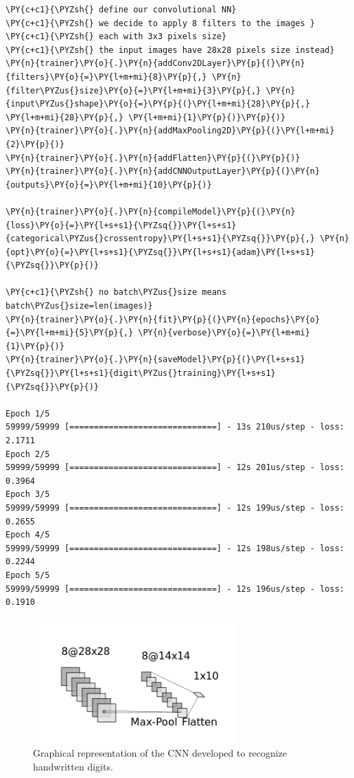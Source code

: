 \begin{tcolorbox}[breakable, size=fbox, boxrule=1pt, pad at break*=1mm,colback=cellbackground, colframe=cellborder]
\begin{Verbatim}[commandchars=\\\{\}]
\PY{c+c1}{\PYZsh{} define our convolutional NN}
\PY{c+c1}{\PYZsh{} we decide to apply 8 filters to the images }
\PY{c+c1}{\PYZsh{} each with 3x3 pixels size}
\PY{c+c1}{\PYZsh{} the input images have 28x28 pixels size instead}
\PY{n}{trainer}\PY{o}{.}\PY{n}{addConv2DLayer}\PY{p}{(}\PY{n}{filters}\PY{o}{=}\PY{l+m+mi}{8}\PY{p}{,} \PY{n}{filter\PYZus{}size}\PY{o}{=}\PY{l+m+mi}{3}\PY{p}{,} \PY{n}{input\PYZus{}shape}\PY{o}{=}\PY{p}{(}\PY{l+m+mi}{28}\PY{p}{,} \PY{l+m+mi}{28}\PY{p}{,} \PY{l+m+mi}{1}\PY{p}{)}\PY{p}{)}
\PY{n}{trainer}\PY{o}{.}\PY{n}{addMaxPooling2D}\PY{p}{(}\PY{l+m+mi}{2}\PY{p}{)}
\PY{n}{trainer}\PY{o}{.}\PY{n}{addFlatten}\PY{p}{(}\PY{p}{)}
\PY{n}{trainer}\PY{o}{.}\PY{n}{addCNNOutputLayer}\PY{p}{(}\PY{n}{outputs}\PY{o}{=}\PY{l+m+mi}{10}\PY{p}{)}
	
\PY{n}{trainer}\PY{o}{.}\PY{n}{compileModel}\PY{p}{(}\PY{n}{loss}\PY{o}{=}\PY{l+s+s1}{\PYZsq{}}\PY{l+s+s1}{categorical\PYZus{}crossentropy}\PY{l+s+s1}{\PYZsq{}}\PY{p}{,} \PY{n}{opt}\PY{o}{=}\PY{l+s+s1}{\PYZsq{}}\PY{l+s+s1}{adam}\PY{l+s+s1}{\PYZsq{}}\PY{p}{)}
	
\PY{c+c1}{\PYZsh{} no batch\PYZus{}size means batch\PYZus{}size=len(images)}
\PY{n}{trainer}\PY{o}{.}\PY{n}{fit}\PY{p}{(}\PY{n}{epochs}\PY{o}{=}\PY{l+m+mi}{5}\PY{p}{,} \PY{n}{verbose}\PY{o}{=}\PY{l+m+mi}{1}\PY{p}{)}
\PY{n}{trainer}\PY{o}{.}\PY{n}{saveModel}\PY{p}{(}\PY{l+s+s1}{\PYZsq{}}\PY{l+s+s1}{digit\PYZus{}training}\PY{l+s+s1}{\PYZsq{}}\PY{p}{)}

Epoch 1/5
59999/59999 [==============================] - 13s 210us/step - loss: 2.1711
Epoch 2/5
59999/59999 [==============================] - 12s 201us/step - loss: 0.3964
Epoch 3/5
59999/59999 [==============================] - 12s 199us/step - loss: 0.2655
Epoch 4/5
59999/59999 [==============================] - 12s 198us/step - loss: 0.2244
Epoch 5/5
59999/59999 [==============================] - 12s 196us/step - loss: 0.1910
\end{Verbatim}
\end{tcolorbox}

\begin{figure}[htb]
	\centering
	\includegraphics[width=0.7\textwidth]{figures/cnn_2d.png}
	\caption{Graphical representation of the CNN developed to recognize handwritten digits.}
        \label{fig:cnn2d}
\end{figure}

